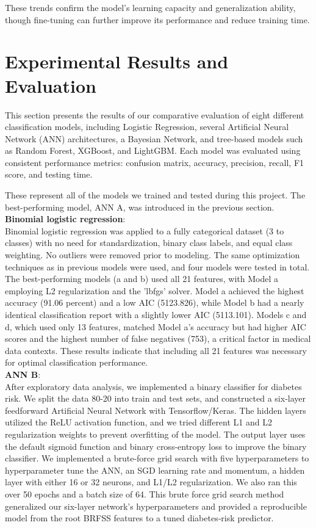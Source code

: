 \documentclass[conference]{IEEEtran}
\begin{document}
These trends confirm the model’s learning capacity and generalization ability, though fine-tuning can further improve its performance and reduce training time.\\

\section{Experimental Results and Evaluation}
This section presents the results of our comparative evaluation of eight different classification models, including Logistic Regression, several Artificial Neural Network (ANN) architectures, a Bayesian Network, and tree-based models such as Random Forest, XGBoost, and LightGBM. Each model was evaluated using consistent performance metrics: confusion matrix, accuracy, precision, recall, F1 score, and testing time.

These represent all of the models we trained and tested during this project. The best-performing model, ANN A, was introduced in the previous section.\\

\noindent
\textbf{Binomial logistic regression}:\\
Binomial logistic regression was applied to a fully categorical dataset (3 to classes) with no need for standardization, binary class labels, and equal class weighting. No outliers were removed prior to modeling. The same optimization techniques as in previous models were used, and four models were tested in total. The best-performing models (a and b) used all 21 features, with Model a employing L2 regularization and the 'lbfgs' solver. Model a achieved the highest accuracy (91.06 percent) and a low AIC (5123.826), while Model b had a nearly identical classification report with a slightly lower AIC (5113.101). Models c and d, which used only 13 features, matched Model a’s accuracy but had higher AIC scores and the highest number of false negatives (753), a critical factor in medical data contexts. These results indicate that including all 21 features was necessary for optimal classification performance.\\

\noindent
\textbf{ANN B}:\\
After exploratory data analysis, we implemented a binary classifier for diabetes risk. We split the data 80-20 into train and test sets, and constructed a six-layer feedforward Artificial Neural Network with Tensorflow/Keras. The hidden layers utilized the ReLU activation function, and we tried different L1 and L2 regularization weights to prevent overfitting of the model. The output layer uses the default sigmoid function and binary cross-entropy loss to improve the binary classifier. We implemented a brute-force grid search with five hyperparameters to hyperparameter tune the ANN, an SGD learning rate and momentum, a hidden layer with either 16 or 32 neurons, and L1/L2 regularization. We also ran this over 50 epochs and a batch size of 64.
This brute force grid search method generalized our six-layer network’s hyperparameters and provided a reproducible model from the root BRFSS features to a tuned diabetes‐risk predictor.\\ 
\end{document}
